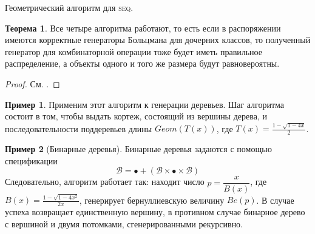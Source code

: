 \documentclass[a5paper]{article}
\theoremstyle{definition}
\newtheorem{example}{Пример}
\newtheorem*{theorem}{Теорема}
\begin{document}
\begin{algorithm}[hbt]
\caption{Геометрический алгоритм для \textsc{seq}.}
\end{algorithm}
\begin{theorem}
    Все четыре алгоритма работают, то есть если в распоряжении имеются
корректные генераторы Больцмана для дочерних классов, то полученный генератор
для комбинаторной операции тоже будет иметь правильное распределение, а объекты
одного и того же размера будут равновероятны.
\end{theorem}
\begin{proof}
    См. \cite{boltzmann}.
\end{proof}
\begin{example}
    Применим этот алгоритм к генерации деревьев.
    Шаг алгоритма состоит в том, чтобы выдать кортеж, состоящий из вершины
дерева, и последовательности поддеревьев длины \( Geom(T(x)) \), где \( T(x) =
\tfrac{1 - \sqrt{1 - 4x}}{2} \).
\end{example}
\begin{example}[Бинарные деревья]
    Бинарные деревья задаются с помощью спецификации
\begin{equation}
    \mathcal B = \bullet + ( \mathcal B \times \bullet \times \mathcal B)
\end{equation}
Следовательно, алгоритм работает так: находит число \( p = \dfrac{x}{B(x)} \),
где \( B(x) = \tfrac{1 - \sqrt{1 - 4x^2}}{2x} \), генерирует бернуллиевскую
величину \( Be(p) \). В случае успеха возвращает единственную вершину, в
противном случае бинарное дерево с вершиной и двумя потомками, сгенерированными
рекурсивно.
\end{example}
\end{document}
